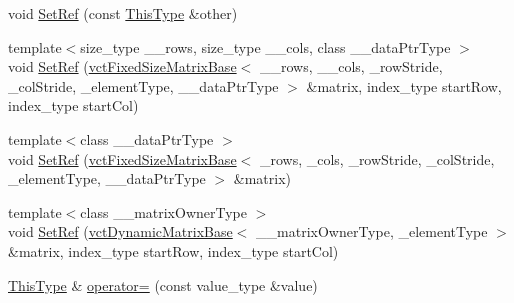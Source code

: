 \begin{DoxyCompactItemize}
void \hyperlink{classvct_fixed_size_matrix_ref_aecb4eaa807ae670268091c0473db872e}{Set\+Ref} (const \hyperlink{classvct_fixed_size_matrix_ref_a29a621c8e22f250f9033e539ad219f95}{This\+Type} \&other)
\item 
{\footnotesize template$<$size\+\_\+type \+\_\+\+\_\+rows, size\+\_\+type \+\_\+\+\_\+cols, class \+\_\+\+\_\+data\+Ptr\+Type $>$ }\\void \hyperlink{classvct_fixed_size_matrix_ref_ad738bf0587d297023a179b7c18c9ea4f}{Set\+Ref} (\hyperlink{classvct_fixed_size_matrix_base}{vct\+Fixed\+Size\+Matrix\+Base}$<$ \+\_\+\+\_\+rows, \+\_\+\+\_\+cols, \+\_\+row\+Stride, \+\_\+col\+Stride, \+\_\+element\+Type, \+\_\+\+\_\+data\+Ptr\+Type $>$ \&matrix, index\+\_\+type start\+Row, index\+\_\+type start\+Col)
\item 
{\footnotesize template$<$class \+\_\+\+\_\+data\+Ptr\+Type $>$ }\\void \hyperlink{classvct_fixed_size_matrix_ref_ad34e0c9c7a45009e92ff3a8d83e908f1}{Set\+Ref} (\hyperlink{classvct_fixed_size_matrix_base}{vct\+Fixed\+Size\+Matrix\+Base}$<$ \+\_\+rows, \+\_\+cols, \+\_\+row\+Stride, \+\_\+col\+Stride, \+\_\+element\+Type, \+\_\+\+\_\+data\+Ptr\+Type $>$ \&matrix)
\item 
{\footnotesize template$<$class \+\_\+\+\_\+matrix\+Owner\+Type $>$ }\\void \hyperlink{classvct_fixed_size_matrix_ref_aaafe4fd67b59e37c0ac0fcf9daf2e548}{Set\+Ref} (\hyperlink{classvct_dynamic_matrix_base}{vct\+Dynamic\+Matrix\+Base}$<$ \+\_\+\+\_\+matrix\+Owner\+Type, \+\_\+element\+Type $>$ \&matrix, index\+\_\+type start\+Row, index\+\_\+type start\+Col)
\item 
\hyperlink{classvct_fixed_size_matrix_ref_a29a621c8e22f250f9033e539ad219f95}{This\+Type} \& \hyperlink{classvct_fixed_size_matrix_ref_aed877da27d7869cf3c92b2cdde12e3f0}{operator=} (const value\+\_\+type \&value)
\end{DoxyCompactItemize}
